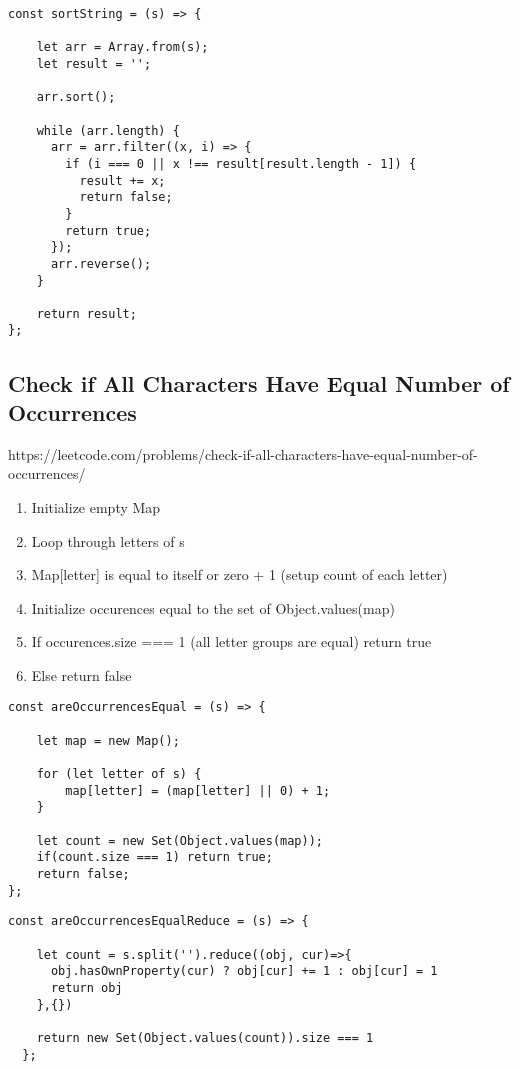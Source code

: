 \documentclass[10pt]{article}
\begin{document}
\begin{lstlisting}[title=Solution sortString, captionpos=t]
const sortString = (s) => {
    
    let arr = Array.from(s);
    let result = '';

    arr.sort();
  
    while (arr.length) {
      arr = arr.filter((x, i) => {
        if (i === 0 || x !== result[result.length - 1]) {
          result += x;
          return false;
        }
        return true;
      });
      arr.reverse();
    }
  
    return result;
};
\end{lstlisting}
\medskip %







\pagebreak %
\medskip   
\subsection{Check if All Characters Have Equal Number of Occurrences}
https://leetcode.com/problems/check-if-all-characters-have-equal-number-of-occurrences/

\begin{enumerate}
	\item Initialize empty Map
	\item Loop through letters of s
	\item Map[letter] is equal to itself or zero + 1 (setup count of each letter)
	\item Initialize occurences equal to the set of Object.values(map)
	\item If occurences.size === 1 (all letter groups are equal) return true
	\item Else return false
\end{enumerate}

\begin{lstlisting}[title=Solution areOccurrencesEqual with Map, captionpos=t]
const areOccurrencesEqual = (s) => {
    
    let map = new Map();
    
    for (let letter of s) {
        map[letter] = (map[letter] || 0) + 1;
    }
    
    let count = new Set(Object.values(map));
    if(count.size === 1) return true;
    return false; 
};
\end{lstlisting}

\begin{lstlisting}[title=Solution areOccurrencesEqual with reduce(), captionpos=t]
const areOccurrencesEqualReduce = (s) => {
    
    let count = s.split('').reduce((obj, cur)=>{
      obj.hasOwnProperty(cur) ? obj[cur] += 1 : obj[cur] = 1
      return obj
    },{})

    return new Set(Object.values(count)).size === 1
  };
\end{lstlisting}
\medskip %
\end{document}
